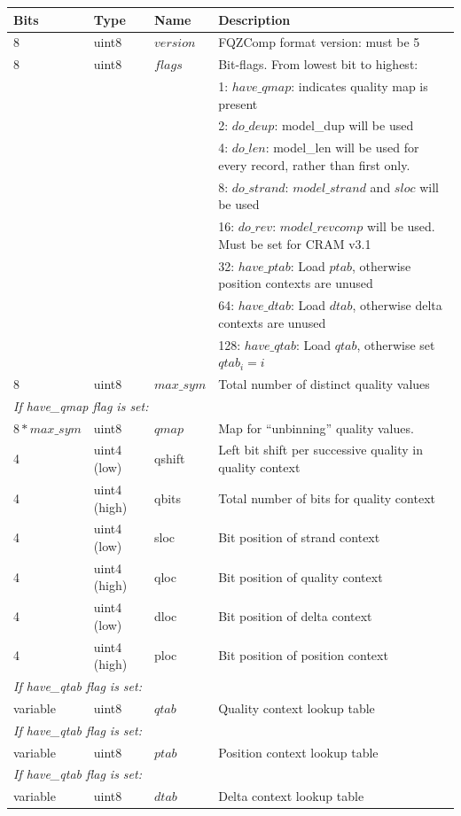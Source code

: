 \documentclass[a4paper]{article}
\begin{document}
\begin{tabular}{lllp{10cm}}
\hline
\textbf{Bits} & \textbf{Type} & \textbf{Name} & \textbf{Description}\\
\hline
8 & uint8 & $version$ & FQZComp format version: must be 5\\
8 & uint8 & $flags$ & Bit-flags. From lowest bit to highest:\\
& & & 1: $have\_qmap$: indicates quality map is present\\
& & & 2: $do\_deup$: model\_dup will be used\\
& & & 4: $do\_len$: model\_len will be used for every record, rather than first only.\\
& & & 8: $do\_strand$: $model\_strand$ and $sloc$ will be used\\
& & & 16: $do\_rev$: $model\_revcomp$ will be used. Must be set for CRAM v3.1\\
& & & 32: $have\_ptab$: Load $ptab$, otherwise position contexts are unused\\
& & & 64: $have\_dtab$: Load $dtab$, otherwise delta contexts are unused\\
& & & 128: $have\_qtab$: Load $qtab$, otherwise set $qtab_i = i$\\
8 & uint8 & $max\_sym$ & Total number of distinct quality values\\
\hline
\multicolumn{4}{l}{\textit{If have\_qmap flag is set:}}\\
$8*max\_sym$ & uint8 & $qmap$ & Map for ``unbinning'' quality values.\\
\hline
4 & uint4 (low)  & qshift & Left bit shift per successive quality in quality context\\
4 & uint4 (high) & qbits  & Total number of bits for quality context\\
4 & uint4 (low)  & sloc   & Bit position of strand context\\
4 & uint4 (high) & qloc   & Bit position of quality context\\
4 & uint4 (low)  & dloc   & Bit position of delta context\\
4 & uint4 (high) & ploc   & Bit position of position context\\
\hline
\multicolumn{4}{l}{\textit{If have\_qtab flag is set:}}\\
variable & uint8 & $qtab$ & Quality context lookup table\\
\hline
\multicolumn{4}{l}{\textit{If have\_qtab flag is set:}}\\
variable & uint8 & $ptab$ & Position context lookup table\\
\hline
\multicolumn{4}{l}{\textit{If have\_qtab flag is set:}}\\
variable & uint8 & $dtab$ & Delta context lookup table\\
\hline
\end{tabular}
\end{document}

